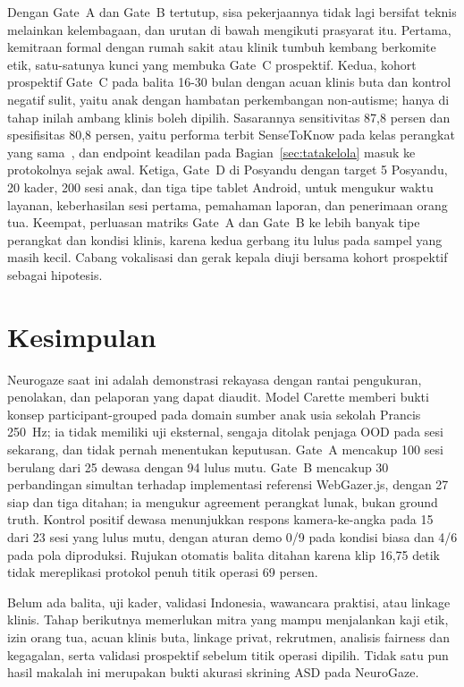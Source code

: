 \documentclass{article}
\begin{document}
Dengan Gate~A dan Gate~B tertutup, sisa pekerjaannya tidak lagi bersifat teknis melainkan
kelembagaan, dan urutan di bawah mengikuti prasyarat itu. Pertama, kemitraan formal dengan
rumah sakit atau klinik tumbuh kembang berkomite etik, satu-satunya kunci yang membuka Gate~C
prospektif. Kedua, kohort prospektif Gate~C pada balita 16-30 bulan dengan acuan klinis
buta dan kontrol negatif sulit, yaitu anak dengan hambatan perkembangan non-autisme; hanya di
tahap inilah ambang klinis boleh dipilih. Sasarannya sensitivitas 87,8 persen dan
spesifisitas 80,8 persen, yaitu performa terbit SenseToKnow pada kelas perangkat yang
sama~\cite{perochon2023}, dan endpoint keadilan pada Bagian~\ref{sec:tatakelola} masuk ke
protokolnya sejak awal. Ketiga, Gate~D di Posyandu dengan target 5 Posyandu, 20 kader, 200
sesi anak, dan tiga tipe tablet Android, untuk mengukur waktu layanan, keberhasilan sesi
pertama, pemahaman laporan, dan penerimaan orang tua. Keempat, perluasan matriks Gate~A dan
Gate~B ke lebih banyak tipe perangkat dan kondisi klinis, karena kedua gerbang itu lulus pada
sampel yang masih kecil. Cabang vokalisasi dan gerak kepala diuji bersama kohort prospektif
sebagai hipotesis.

\section{Kesimpulan}

Neurogaze saat ini adalah demonstrasi rekayasa dengan rantai pengukuran, penolakan, dan
pelaporan yang dapat diaudit. Model Carette memberi bukti konsep participant-grouped pada
domain sumber anak usia sekolah Prancis 250~Hz; ia tidak memiliki uji eksternal, sengaja
ditolak penjaga OOD pada sesi sekarang, dan tidak pernah menentukan keputusan. Gate~A
mencakup 100 sesi berulang dari 25 dewasa dengan 94 lulus mutu. Gate~B mencakup 30
perbandingan simultan terhadap implementasi referensi WebGazer.js, dengan 27 siap dan tiga
ditahan; ia mengukur agreement perangkat lunak, bukan ground truth. Kontrol positif dewasa
menunjukkan respons kamera-ke-angka pada 15 dari 23 sesi yang lulus mutu, dengan aturan demo
0/9 pada kondisi biasa dan 4/6 pada pola diproduksi. Rujukan otomatis balita ditahan karena
klip 16,75 detik tidak mereplikasi protokol penuh titik operasi 69 persen.

Belum ada balita, uji kader, validasi Indonesia, wawancara praktisi, atau linkage klinis.
Tahap berikutnya memerlukan mitra yang mampu menjalankan kaji etik, izin orang tua, acuan
klinis buta, linkage privat, rekrutmen, analisis fairness dan kegagalan, serta validasi
prospektif sebelum titik operasi dipilih. Tidak satu pun hasil makalah ini merupakan bukti
akurasi skrining ASD pada NeuroGaze.
\end{document}
